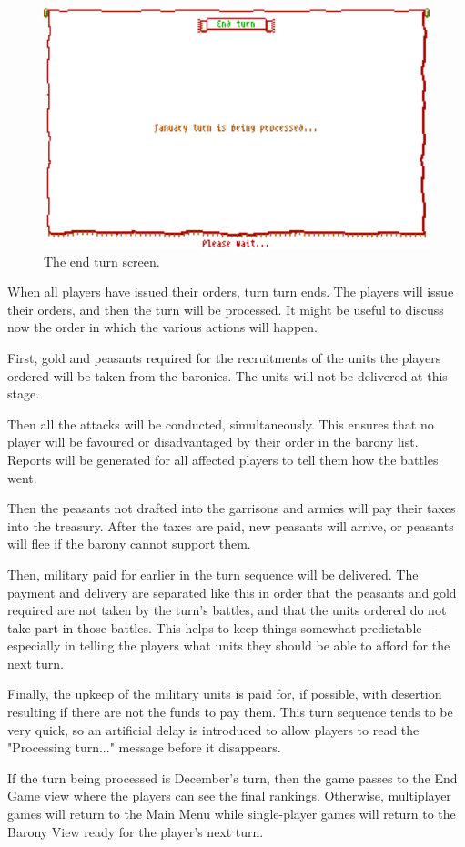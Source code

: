 \documentclass[8pt]{extarticle}
\begin{document}
\begin{figure}
  \centering
  \includegraphics[width=\textwidth]{turn}
  \caption*{The end turn screen.}
  \label{fig:title}
\end{figure}

\begin{multicols}{2}
\noindent
When all players have issued their orders, turn turn ends. The players will issue their orders, and then the turn will be processed. It might be useful to discuss now the order in which the various actions will happen.

First, gold and peasants required for the recruitments of the units the players ordered will be taken from the baronies. The units will not be delivered at this stage.

Then all the attacks will be conducted, simultaneously. This ensures that no player will be favoured or disadvantaged by their order in the barony list. Reports will be generated for all affected players to tell them how the battles went.

Then the peasants not drafted into the garrisons and armies will pay their taxes into the treasury. After the taxes are paid, new peasants will arrive, or peasants will flee if the barony cannot support them.

Then, military paid for earlier in the turn sequence will be delivered. The payment and delivery are separated like this in order that the peasants and gold required are not taken by the turn's battles, and that the units ordered do not take part in those battles. This helps to keep things somewhat predictable---especially in telling the players what units they should be able to afford for the next turn.

Finally, the upkeep of the military units is paid for, if possible, with desertion resulting if there are not the funds to pay them. This turn sequence tends to be very quick, so an artificial delay is introduced to allow players to read the "Processing turn..." message before it disappears.

If the turn being processed is December's turn, then the game passes to the End Game view where the players can see the final rankings. Otherwise, multiplayer games will return to the Main Menu while single-player games will return to the Barony View ready for the player's next turn.
\end{multicols}
\end{document}
